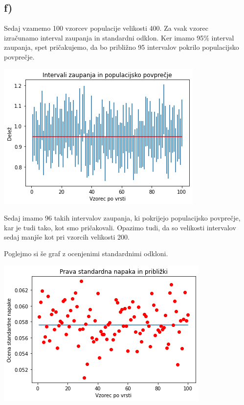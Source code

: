 \documentclass[12pt, a4paper]{article}
\begin{document}
\subsection*{f)}

Sedaj vzamemo 100 vzorcev populacije velikosti 400. Za vsak vzorec \\izračunamo
interval zaupanja in standardni odklon. Ker imamo 95\% interval zaupanja, spet
pričakujemo, da bo približno 95 intervalov pokrilo populacijsko povprečje.

\begin{center}
    \includegraphics[scale=0.7]{Intervali_zaupanja_400.png}
\end{center}

Sedaj imamo 96 takih intervalov zaupanja, ki pokrijejo populacijsko povprečje,
kar je tudi tako, kot smo pričakovali. Opazimo tudi, da so velikosti intervalov
sedaj manjše kot pri vzorcih velikosti 200.

Poglejmo si še graf z ocenjenimi standardnimi odkloni.

\begin{center}
    \includegraphics[scale=0.7]{St_napaka_400.png}
\end{center}
\end{document}
